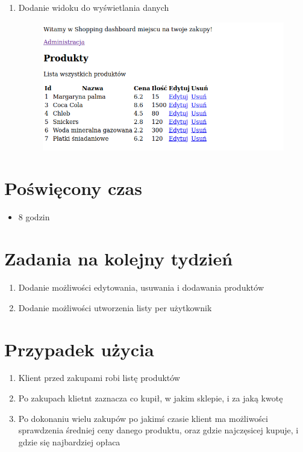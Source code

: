 \documentclass[12pt]{article}
\begin{document}
\begin{enumerate}
		\item Dodanie widoku do wyświetlania danych
		\begin{figure} [H]
			\centering
			\includegraphics{widok}
			\label{fig:widok}
		\end{figure}
	\end{enumerate}
	\section{Poświęcony czas}
	\begin{itemize}
		\item 8 godzin
	\end{itemize}
	\section{Zadania na kolejny tydzień}
	\begin{enumerate}
		\item Dodanie możliwości edytowania, usuwania i dodawania produktów
		\item Dodanie możliwości utworzenia listy per użytkownik
	\end{enumerate}
	\section{Przypadek użycia}
	\begin{enumerate}
	\item Klient przed zakupami robi listę produktów
	\item Po zakupach klietnt zaznacza co kupił, w jakim sklepie, i za jaką kwotę
	\item Po dokonaniu wielu zakupów po jakimś czasie klient ma  możliwości sprawdzenia średniej ceny danego produktu, oraz gdzie najczęsicej kupuje, i gdzie się najbardziej opłaca
	\end{enumerate}
\end{document}
